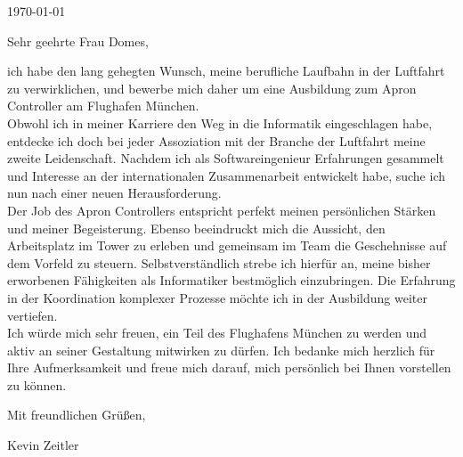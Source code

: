 \documentclass[10pt, a4paper]{article}
\begin{document}
\makeprofile %

\makecontact %

\today %

\makeemployerinfo %

Sehr geehrte Frau Domes,

ich habe den lang gehegten Wunsch, meine berufliche Laufbahn in der Luftfahrt zu verwirklichen,
und bewerbe mich daher um eine Ausbildung zum Apron Controller am Flughafen München.
\\Obwohl ich in meiner Karriere den Weg in die Informatik eingeschlagen habe,
entdecke ich doch bei jeder Assoziation mit der Branche der Luftfahrt meine zweite Leidenschaft.
Nachdem ich als Softwareingenieur Erfahrungen gesammelt und Interesse an der internationalen Zusammenarbeit
entwickelt habe, suche ich nun nach einer neuen Herausforderung.
\\Der Job des Apron Controllers entspricht perfekt meinen persönlichen Stärken und meiner Begeisterung.
Ebenso beeindruckt mich die Aussicht, den Arbeitsplatz im Tower zu erleben und gemeinsam im Team die Geschehnisse auf dem Vorfeld zu steuern.
Selbstverständlich strebe ich hierfür an, meine bisher erworbenen Fähigkeiten als Informatiker bestmöglich einzubringen.
Die Erfahrung in der Koordination komplexer Prozesse möchte ich in der Ausbildung weiter vertiefen.
\\Ich würde mich sehr freuen, ein Teil des Flughafens München zu werden und aktiv an seiner Gestaltung mitwirken zu dürfen.
Ich bedanke mich herzlich für Ihre Aufmerksamkeit und freue mich darauf, mich persönlich bei Ihnen vorstellen zu können.




Mit freundlichen Grüßen,

Kevin Zeitler
\end{document}
